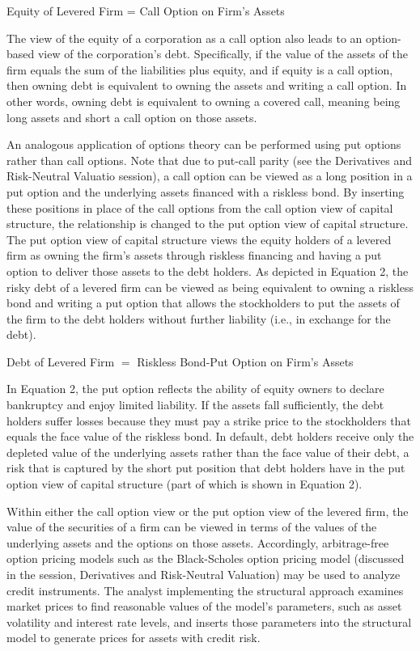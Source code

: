 \documentclass[11pt]{article}
\begin{document}
Equity of Levered Firm = Call Option on Firm's Assets

The view of the equity of a corporation as a call option also leads to an option-based view of the corporation's debt. Specifically, if the value of the assets of the firm equals the sum of the liabilities plus equity, and if equity is a call option, then owning debt is equivalent to owning the assets and writing a call option. In other words, owning debt is equivalent to owning a covered call, meaning being long assets and short a call option on those assets.

An analogous application of options theory can be performed using put options rather than call options. Note that due to put-call parity (see the Derivatives and Risk-Neutral Valuatio session), a call option can be viewed as a long position in a put option and the underlying assets financed with a riskless bond. By inserting these positions in place of the call options from the call option view of capital structure, the relationship is changed to the put option view of capital structure. The put option view of capital structure views the equity holders of a levered firm as owning the firm's assets through riskless financing and having a put option to deliver those assets to the debt holders. As depicted in Equation 2, the risky debt of a levered firm can be viewed as being equivalent to owning a riskless bond and writing a put option that allows the stockholders to put the assets of the firm to the debt holders without further liability (i.e., in exchange for the debt).

Debt of Levered Firm $=$ Riskless Bond-Put Option on Firm's Assets

In Equation 2, the put option reflects the ability of equity owners to declare bankruptcy and enjoy limited liability. If the assets fall sufficiently, the debt holders suffer losses because they must pay a strike price to the stockholders that equals the face value of the riskless bond. In default, debt holders receive only the depleted value of the underlying assets rather than the face value of their debt, a risk that is captured by the short put position that debt holders have in the put option view of capital structure (part of which is shown in Equation 2).

Within either the call option view or the put option view of the levered firm, the value of the securities of a firm can be viewed in terms of the values of the underlying assets and the options on those assets. Accordingly, arbitrage-free option pricing models such as the Black-Scholes option pricing model (discussed in the session, Derivatives and Risk-Neutral Valuation) may be used to analyze credit instruments. The analyst implementing the structural approach examines market prices to find reasonable values of the model's parameters, such as asset volatility and interest rate levels, and inserts those parameters into the structural model to generate prices for assets with credit risk.
\end{document}
